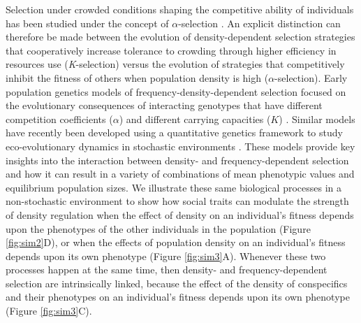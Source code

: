 \documentclass{article}
\begin{document}
	Selection under crowded conditions shaping the competitive ability of individuals has been studied under the concept of ${\alpha}$-selection \citep{Joshi2001}. An explicit distinction can therefore be made between the evolution of density-dependent selection strategies that cooperatively increase tolerance to crowding through higher efficiency in resources use (\textit{K}-selection) versus the evolution of strategies that competitively inhibit the fitness of others when population density is high (${\alpha}$-selection). Early population genetics models of frequency-density-dependent selection focused on the evolutionary consequences of interacting genotypes that have different competition coefficients ($\alpha$) and different carrying capacities ($K$) \citep{Clarke1972, Anderson1983}. Similar models have recently been developed using a quantitative genetics framework to study eco-evolutionary dynamics in stochastic environments \citep{Lande2007, Engen2020}. These models provide key insights into the interaction between density- and frequency-dependent selection and how it can result in a variety of combinations of mean phenotypic values and equilibrium population sizes. We illustrate these same biological processes in a non-stochastic environment to show how social traits can modulate the strength of density regulation when the effect of density on an individual's fitness depends upon the phenotypes of the other individuals in the population (Figure \ref{fig:sim2}D), or when the effects of population density on an individual's fitness depends upon its own phenotype (Figure \ref{fig:sim3}A). Whenever these two processes happen at the same time, then density- and frequency-dependent selection are intrinsically linked, because the effect of the density of conspecifics and their phenotypes on an individual's fitness depends upon its own phenotype (Figure \ref{fig:sim3}C). 
	
\end{document}
